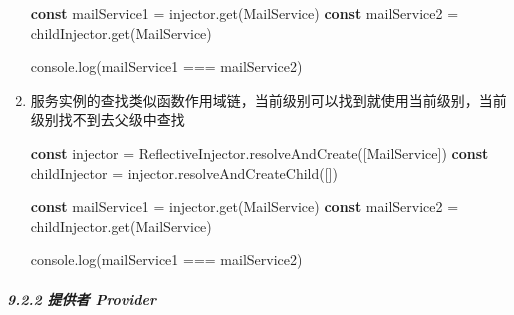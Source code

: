 \documentclass[
]{article}
\newenvironment{Shaded}{}{}
\newcommand{\BuiltInTok}[1]{#1}
\newcommand{\FunctionTok}[1]{\textcolor[rgb]{0.02,0.16,0.49}{#1}}
\newcommand{\KeywordTok}[1]{\textcolor[rgb]{0.00,0.44,0.13}{\textbf{#1}}}
\newcommand{\NormalTok}[1]{#1}
\newcommand{\OperatorTok}[1]{\textcolor[rgb]{0.40,0.40,0.40}{#1}}
\begin{document}
\begin{enumerate}
\begin{Shaded}
\begin{Highlighting}[]
\KeywordTok{const}\NormalTok{ mailService1 }\OperatorTok{=}\NormalTok{ injector}\OperatorTok{.}\FunctionTok{get}\NormalTok{(MailService)}
\KeywordTok{const}\NormalTok{ mailService2 }\OperatorTok{=}\NormalTok{ childInjector}\OperatorTok{.}\FunctionTok{get}\NormalTok{(MailService)}

\BuiltInTok{console}\OperatorTok{.}\FunctionTok{log}\NormalTok{(mailService1 }\OperatorTok{===}\NormalTok{ mailService2)}
\end{Highlighting}
\end{Shaded}
\item
  服务实例的查找类似函数作用域链，当前级别可以找到就使用当前级别，当前级别找不到去父级中查找

\begin{Shaded}
\begin{Highlighting}[]
\KeywordTok{const}\NormalTok{ injector }\OperatorTok{=}\NormalTok{ ReflectiveInjector}\OperatorTok{.}\FunctionTok{resolveAndCreate}\NormalTok{([MailService])}
\KeywordTok{const}\NormalTok{ childInjector }\OperatorTok{=}\NormalTok{ injector}\OperatorTok{.}\FunctionTok{resolveAndCreateChild}\NormalTok{([])}

\KeywordTok{const}\NormalTok{ mailService1 }\OperatorTok{=}\NormalTok{ injector}\OperatorTok{.}\FunctionTok{get}\NormalTok{(MailService)}
\KeywordTok{const}\NormalTok{ mailService2 }\OperatorTok{=}\NormalTok{ childInjector}\OperatorTok{.}\FunctionTok{get}\NormalTok{(MailService)}

\BuiltInTok{console}\OperatorTok{.}\FunctionTok{log}\NormalTok{(mailService1 }\OperatorTok{===}\NormalTok{ mailService2)}
\end{Highlighting}
\end{Shaded}
\end{enumerate}

\hypertarget{922-ux63d0ux4f9bux8005-provider}{%
\subparagraph{9.2.2 提供者
Provider}\label{922-ux63d0ux4f9bux8005-provider}}
\end{document}
